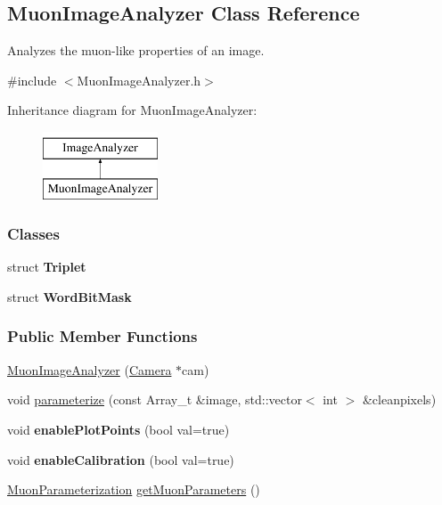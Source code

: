 \hypertarget{classMuonImageAnalyzer}{
\subsection{MuonImageAnalyzer Class Reference}
\label{classMuonImageAnalyzer}
}


Analyzes the muon-\/like properties of an image.  




{\ttfamily \#include $<$MuonImageAnalyzer.h$>$}

Inheritance diagram for MuonImageAnalyzer:\begin{figure}[H]
\begin{center}
\leavevmode
\includegraphics[height=2.000000cm]{classMuonImageAnalyzer}
\end{center}
\end{figure}
\subsubsection*{Classes}
\begin{DoxyCompactItemize}
\item 
struct {\bfseries Triplet}
\item 
struct {\bfseries WordBitMask}
\end{DoxyCompactItemize}
\subsubsection*{Public Member Functions}
\begin{DoxyCompactItemize}
\item 
\hypertarget{classMuonImageAnalyzer_ace536b6518d8bfcbc14afbd252c2cedb}{
\hyperlink{classMuonImageAnalyzer_ace536b6518d8bfcbc14afbd252c2cedb}{MuonImageAnalyzer} (\hyperlink{classCamera}{Camera} $\ast$cam)}
\label{classMuonImageAnalyzer_ace536b6518d8bfcbc14afbd252c2cedb}

\item 
void \hyperlink{classMuonImageAnalyzer_a539a77fa50b32358483b951ceaca22bf}{parameterize} (const Array\_\-t \&image, std::vector$<$ int $>$ \&cleanpixels)
\item 
\hypertarget{classMuonImageAnalyzer_ac13b60121bd5008c0188dfd7d3a04112}{
void {\bfseries enablePlotPoints} (bool val=true)}
\label{classMuonImageAnalyzer_ac13b60121bd5008c0188dfd7d3a04112}

\item 
\hypertarget{classMuonImageAnalyzer_af5825426d2866ab9613d13621bee5867}{
void {\bfseries enableCalibration} (bool val=true)}
\label{classMuonImageAnalyzer_af5825426d2866ab9613d13621bee5867}

\item 
\hyperlink{structMuonParameterization}{MuonParameterization} \hyperlink{classMuonImageAnalyzer_a2b82168624627844ea7502fb3a182767}{getMuonParameters} ()
\end{DoxyCompactItemize}


